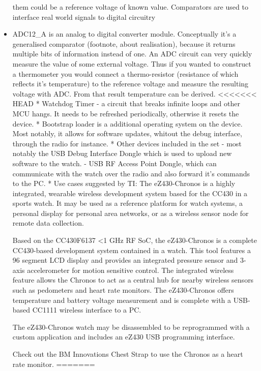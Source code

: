 \begin{commnet}
\begin{itemize}
     them could be a reference voltage of known value. Comparators are
     used to interface real world signals to digital circuitry
 \item ADC12\_A is an analog to digital converter module. Conceptually
     it's a generalised comparator (footnote, about realisation),
     because it returns multiple bits of information instead of one.
     An ADC circuit can very quickly measure the value of some
     external voltage. Thus if you wanted to construct a thermometer
     you would connect a thermo-resistor (resistance of which reflects
     it's temperature) to the reference voltage and measure the
     resulting voltage with ADC. From that result temperature can be
     derived.
<<<<<<< HEAD
     * Watchdog Timer - a circuit that breaks infinite loops and other
     MCU hangs. It needs to be refreshed periodically, otherwise it
     resets the device.
     * Bootstrap loader is a additional operating system on the
     device. Most notably, it allows for software updates, whitout the
     debug interface, through the radio for
     instance.
  * Other devices included in the set
    - most notably the USB Debug Interface Dongle which is used to
    upload new software to the watch.
    - USB RF Access Point Dongle, which can communicate with the watch
    over the radio and also forward it's commands to the PC.
  * Use cases suggested by TI:
  The eZ430-Chronos is a highly integrated, wearable wireless
  development system based for the CC430 in a sports watch. It may be
  used as a reference platform for watch systems, a personal display
  for personal area networks, or as a wireless sensor node for remote
  data collection.

  Based on the CC430F6137 <1 GHz RF SoC, the eZ430-Chronos is a
  complete CC430-based development system contained in a watch. This
  tool features a 96 segment LCD display and provides an integrated
  pressure sensor and 3-axis accelerometer for motion sensitive
  control. The integrated wireless feature allows the Chronos to act
  as a central hub for nearby wireless sensors such as pedometers and
  heart rate monitors. The eZ430-Chronos offers temperature and
  battery voltage measurement and is complete with a USB-based CC1111
  wireless interface to a PC.

  The eZ430-Chronos watch may be disassembled to be reprogrammed with
  a custom application and includes an eZ430 USB programming
  interface.

  Check out the BM Innovations Chest Strap to use the Chronos as a
  heart rate monitor.
=======
\end{itemize}


\end{commnet}
